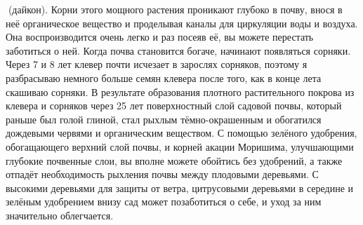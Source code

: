 \documentclass[a4paper]{book}
\begin{document}
(дайкон). Корни этого мощного растения проникают глубоко в почву, внося в неё
органическое вещество и проделывая каналы для циркуляции воды и воздуха. Она
воспроизводится очень легко и раз посеяв её, вы можете перестать заботиться о ней.
Когда почва становится богаче, начинают появляться сорняки. Через 7 и 8 лет клевер
почти исчезает в зарослях сорняков, поэтому я разбрасываю немного больше семян клевера
после того, как в конце лета скашиваю сорняки. В результате образования плотного
растительного покрова из клевера и сорняков через 25 лет поверхностный слой садовой
почвы, который раньше был голой глиной, стал рыхлым тёмно-окрашенным и обогатился
дождевыми червями и органическим веществом.
С помощью зелёного удобрения, обогащающего верхний слой почвы, и корней акации
Моришима, улучшающими глубокие почвенные слои, вы вполне можете обойтись без
удобрений, а также отпадёт необходимость рыхления почвы между плодовыми деревьями. С
высокими деревьями для защиты от ветра, цитрусовыми деревьями в середине и зелёным
удобрением внизу сад может позаботиться о себе, и уход за ним значительно облегчается.
\end{document}
